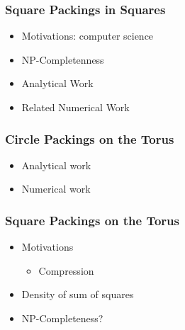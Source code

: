 \documentclass[11pt]{article}
\begin{document}
\subsubsection{Square Packings in Squares}
\label{sec-2.1.1}

\begin{itemize}

\item Motivations: computer science\\
\label{sec-2.1.1.1}


\item NP-Completenness\\
\label{sec-2.1.1.2}


\item Analytical Work\\
\label{sec-2.1.1.3}


\item Related Numerical Work\\
\label{sec-2.1.1.4}


\end{itemize} %
\subsubsection{Circle Packings on the Torus}
\label{sec-2.1.2}

\begin{itemize}

\item Analytical work\\
\label{sec-2.1.2.1}


\item Numerical work\\
\label{sec-2.1.2.2}


\end{itemize} %
\subsubsection{Square Packings on the Torus}
\label{sec-2.1.3}

\begin{itemize}

\item Motivations\\
\label{sec-2.1.3.1}

\begin{itemize}

\item Compression\\
\label{sec-2.1.3.1.1}

\end{itemize} %

\item Density of sum of squares\\
\label{sec-2.1.3.2}


\item NP-Completeness?\\
\label{sec-2.1.3.3}




\end{itemize} %
\end{document}
